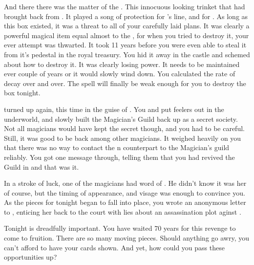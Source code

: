 \documentclass[char]{NeptuneBall}
\begin{document}
And there there was the matter of the \iMusicBox{\MYname}. This innocuous looking trinket that \cQueen{} had brought back from \cNixie{}. It played a song of protection for \cKing{}'s line, and for \pAtlantis{}. As long as this box existed, it was a threat to all of your carefully laid plans. It was clearly a powerful magical item equal almost to the \iTrident{\MYname}, for when you tried to destroy it, your ever attempt was thwarted. It took 11 years before you were even able to steal it from it's pedestal in the royal treasury. You hid it away in the castle and schemed about how to destroy it. It was clearly losing power. It needs to be maintained ever couple of years or it would slowly wind down. You calculated the rate of decay over and over. The spell will finally be weak enough for you to destroy the box tonight.

\cWitch{} turned up again, this time in the guise of \cWitch{\MYname}. You and \cWitch{\they} put feelers out in the underworld, and slowly built the Magician's Guild back up as a secret society. Not all magicians would have kept the secret though, and you had to be careful. Still, it was good to be back among other magicians. It weighed heavily on you that there was no way to contact the \pPacifica{}n counterpart to the Magician's guild reliably. You got one message through, telling them that you had revived the Guild in \pAtlantis{} and that was it.

In a stroke of luck, one of the magicians had word of \cQueen{}. He didn't know it was her of course, but the timing of \cQueen{\them} appearance, and \cQueen{\them} visage was enough to convince you. As the pieces for tonight began to fall into place, you wrote an anonymous letter to \cQueen{}, enticing her back to the court with lies about an assassination plot aginst \cKing{}.

Tonight is dreadfully important. You have waited 70 years for this revenge to come to fruition. There are so many moving pieces. Should anything go awry, you can't afford to have your cards shown. And yet, how could you pass these opportunities up?
\end{document}

